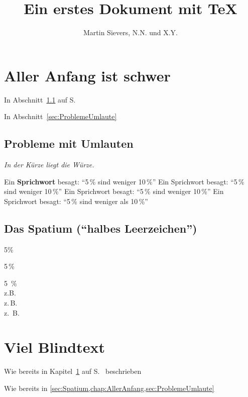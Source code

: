 \documentclass[
    fontsize=11pt,%
    paper=a4,%
    headings=small,
    parskip=half-,
    listof=totoc,
    bibliography=totoc,
    cleardoublepage=empty,
    pagesize
]{scrbook}
\theoremstyle{break}
\theoremstyle{plain}
\begin{document}
\frontmatter
\title{Ein erstes Dokument mit \TeX{}}
\author{Martin Sievers, N.N. und X.Y.}
\date{}
\maketitle

\begin{spacing}{1.0}
\tableofcontents
\listoffigures
\listoftables
{}
\end{spacing}

\mainmatter
\chapter{Aller Anfang ist schwer}\label{chap:AllerAnfang}
In Abschnitt~\ref{sec:ProblemeUmlaute} auf S.~\pageref{sec:ProblemeUmlaute}

In Abschnitt~\vref{sec:ProblemeUmlaute}
\blindtext[8]

\section{Probleme mit Umlauten}\label{sec:ProblemeUmlaute}
{\itshape   In der Kürze liegt die Würze.}
    
{\Large Ein \textbf{Sprichwort} besagt: "`5\,\% sind weniger 10\,\%"' Ein Sprichwort besagt: "`5\,\% sind 
weniger 10\,\%"' 
Ein 
Sprichwort besagt: "`5\,\% sind weniger 10\,\%"' Ein Sprichwort besagt: "`5\,\% sind weniger als 10\,\%"'}

\section{Das Spatium ("`halbes Leerzeichen"')}\label{sec:Spatium}
5\%\par 5\,\%

5~\%\\
z.B.\\
z.\,B.\\[2cm]
z.~B.

\chapter{Viel Blindtext}
Wie bereits in Kapitel~\ref{chap:AllerAnfang} auf S.~\pageref{chap:AllerAnfang} beschrieben

Wie bereits in \cref{sec:Spatium,chap:AllerAnfang,sec:ProblemeUmlaute}

\blindtext
\begin{center}
    \blindtext[2]
\end{center}
\blindtext[8]
\end{document}
